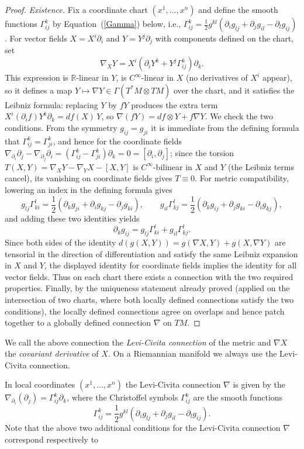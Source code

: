 \begin{proof}
\emph{Existence.} Fix a coordinate chart $(x^1,\ldots,x^n)$ and
define the smooth functions $\Gamma^k_{ij}$ by
Equation~(\ref{Gamma}) below, i.e.,
$\Gamma^{k}_{ij}=\frac{1}{2}g^{kl}(\partial_i g_{lj}+\partial_j
g_{il}-\partial_l g_{ij})$. For vector fields $X=X^i\partial_i$ and
$Y=Y^j\partial_j$ with components defined on the chart, set
$$\nabla_XY=X^i\left(\partial_iY^k+Y^j\Gamma^k_{ij}\right)\partial_k.$$
This expression is $\mathbb{R}$-linear in $Y$, is $C^\infty$-linear
in $X$ (no derivatives of $X^i$ appear), so it defines a map
$Y\mapsto \nabla Y\in \Gamma(T^*M\otimes TM)$ over the chart, and it
satisfies the Leibniz formula: replacing $Y$ by $fY$ produces the
extra term $X^i(\partial_if)Y^k\partial_k=df(X)\,Y$, so
$\nabla(fY)=df\otimes Y+f\nabla Y$. We check the two conditions. From
the symmetry $g_{ij}=g_{ji}$ it is immediate from the defining
formula that $\Gamma^k_{ij}=\Gamma^k_{ji}$, and hence for the
coordinate fields
$\nabla_{\partial_i}\partial_j-\nabla_{\partial_j}\partial_i
=(\Gamma^k_{ij}-\Gamma^k_{ji})\partial_k=0=[\partial_i,\partial_j]$;
since the torsion $T(X,Y)=\nabla_XY-\nabla_YX-[X,Y]$ is
$C^\infty$-bilinear in $X$ and $Y$ (the Leibniz terms cancel), its
vanishing on coordinate fields gives $T\equiv 0$. For metric
compatibility, lowering an index in the defining formula gives
$$g_{lj}\Gamma^l_{ki}=\frac{1}{2}\left(\partial_kg_{ji}+\partial_ig_{kj}-\partial_jg_{ki}\right),
\qquad
g_{il}\Gamma^l_{kj}=\frac{1}{2}\left(\partial_kg_{ij}+\partial_jg_{ki}-\partial_ig_{kj}\right),$$
and adding these two identities yields
$$\partial_k g_{ij}=g_{lj}\Gamma^l_{ki}+g_{il}\Gamma^l_{kj}.$$
Since both sides of the identity $d(g(X,Y))=g(\nabla X,Y)+g(X,\nabla
Y)$ are tensorial in the direction of differentiation and satisfy
the same Leibniz expansion in $X$ and $Y$, the displayed identity
for coordinate fields implies the identity for all vector fields.
Thus on each chart there exists a connection with the two required
properties. Finally, by the uniqueness statement already proved
(applied on the intersection of two charts, where both locally
defined connections satisfy the two conditions), the locally defined
connections agree on overlaps and hence patch together to a globally
defined connection $\nabla$ on $TM$.
\end{proof}

 We call the
above connection the {\sl Levi-Civita connection} of the metric and $\nabla X$ the {\sl covariant
derivative} of $X$. On a Riemannian manifold we always use the
Levi-Civita connection.

In local coordinates $(x^1,\ldots,x^n)$ the Levi-Civita connection
$\nabla$ is given by the $\nabla_{\partial_i}(\partial_j) =
\Gamma^{k}_{ij}\partial_k$, where the Christoffel symbols
$\Gamma^k_{ij}$ are the smooth functions
\begin{equation}\label{Gamma}
\Gamma^{k}_{ij}= \frac{1}{2}g^{kl}(\partial_i g_{l j} +\partial_j
g_{il}-\partial_l g_{ij}). \end{equation}
 Note that the above two
additional conditions for the Levi-Civita connection $\nabla$
correspond respectively to

